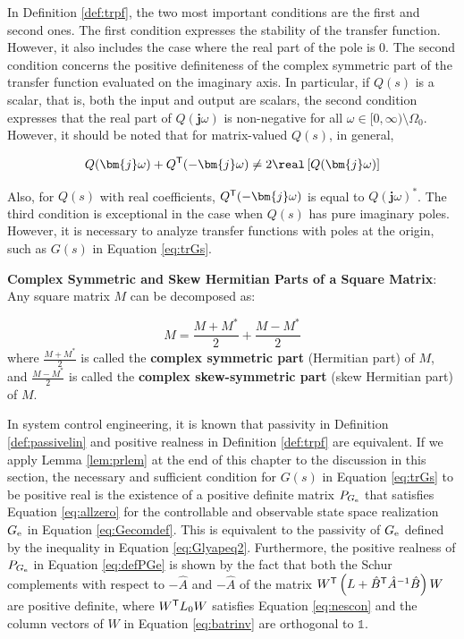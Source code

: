 \documentclass[graybox, envcountchap]{svmult}
\begin{document}
In Definition \ref{def:trpf}, the two most important conditions are the first
and second ones. The first condition expresses the stability of the transfer
function. However, it also includes the case where the real part of the pole is
0. The second condition concerns the positive definiteness of the complex
symmetric part of the transfer function evaluated on the imaginary axis. In
particular, if $Q(s)$ is a scalar, that is, both the input and output are
scalars, the second condition expresses that the real part of $Q(\bm{j}\omega)$
is non-negative for all $\omega \in [0,\infty)\setminus \Omega_0$. However, it
should be noted that for matrix-valued $Q(s)$, in general,

\begin{equation*}
  Q(\bm{j} \omega) + Q^{\sf T}(-\bm{j} \omega) \neq 2 \real\left[ Q(\bm{j} \omega) \right]
\end{equation*}

Also, for $Q(s)$ with real coefficients, $Q^{\sf T}( -\bm{j} \omega)$ is equal
to ${Q(\bm{j} \omega)}^*$. The third condition is exceptional in the case when
$Q(s)$ has pure imaginary poles. However, it is necessary to analyze transfer
functions with poles at the origin, such as $G(s)$ in Equation \ref{eq:trGs}.

\begin{COLUMN}
\noindent \textbf{Complex Symmetric and Skew Hermitian Parts of a Square Matrix}:
Any square matrix $M$ can be decomposed as:

\[
M=\frac{M+M^*}{2}+\frac{M-M^*}{2}
\]
where $\tfrac{M+M^*}{2}$ is called the \textbf{complex symmetric part} (Hermitian
part)  of $M$, and $\tfrac{M-M^*}{2}$ is called the
\textbf{complex skew-symmetric part} (skew Hermitian part)  of $M$.
\end{COLUMN}

In system control engineering, it is known that passivity in Definition
\ref{def:passivelin} and positive realness in Definition \ref{def:trpf} are
equivalent. If we apply Lemma \ref{lem:prlem} at the end of this chapter to the
discussion in this section, the necessary and sufficient condition for $G(s)$ in
Equation \ref{eq:trGs} to be positive real is the existence of a positive
definite matrix $P_{G_{\rm e}}$ that satisfies Equation \ref{eq:allzero} for the
controllable and observable state space realization $G_{\rm e}$ in Equation
\ref{eq:Gecomdef}. This is equivalent to the passivity of $G_{\rm e}$ defined by
the inequality in Equation \ref{eq:Glyapeq2}. Furthermore, the positive
realness of $P_{G_{\rm e}}$ in Equation \ref{eq:defPGe} is shown by the fact
that both the Schur complements with respect to $-\hat{A}$ and $-\hat{A}$ of the
matrix $W^{\sf T} \left(L+\hat{B}^{\sf T} \hat{A}^{-1} \hat{B} \right) W$ are
positive definite, where $W^{\sf T} L_0 W$ satisfies Equation \ref{eq:nescon}
and the column vectors of $W$ in Equation \ref{eq:batrinv} are orthogonal to
$\mathds{1}$.
\end{document}
